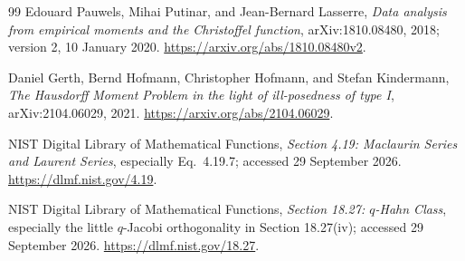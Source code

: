 \documentclass[11pt,letterpaper]{article}
\numberwithin{equation}{section}
\theoremstyle{definition}
\theoremstyle{remark}
\begin{document}
\begin{thebibliography}{99}
Edouard Pauwels, Mihai Putinar, and Jean-Bernard Lasserre,
\emph{Data analysis from empirical moments and the Christoffel function},
arXiv:1810.08480, 2018; version 2, 10 January 2020.
\url{https://arxiv.org/abs/1810.08480v2}.

Daniel Gerth, Bernd Hofmann, Christopher Hofmann, and Stefan Kindermann,
\emph{The Hausdorff Moment Problem in the light of ill-posedness of type I},
arXiv:2104.06029, 2021.
\url{https://arxiv.org/abs/2104.06029}.

NIST Digital Library of Mathematical Functions,
\emph{Section 4.19: Maclaurin Series and Laurent Series},
especially Eq.~4.19.7; accessed 29 September 2026.
\url{https://dlmf.nist.gov/4.19}.

NIST Digital Library of Mathematical Functions,
\emph{Section 18.27: $q$-Hahn Class}, especially the little $q$-Jacobi
orthogonality in Section 18.27(iv); accessed 29 September 2026.
\url{https://dlmf.nist.gov/18.27}.
\end{thebibliography}
\end{document}
